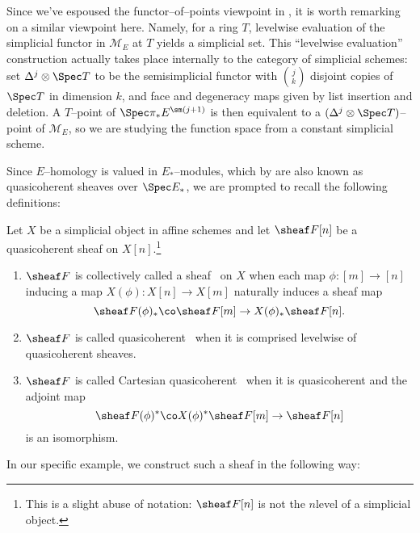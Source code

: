 \begin{remark}
Since we've espoused the functor--of--points viewpoint in , it is worth remarking on a similar viewpoint here.  Namely, for a ring $T$, levelwise evaluation of the simplicial functor in $\mathcal{M}_E$ at $T$ yields a simplicial set.  This ``levelwise evaluation'' construction actually takes place internally to the category of simplicial schemes: set $\Delta^j \otimes \Spec T$ to be the semisimplicial functor with $\binom{j}{k}$ disjoint copies of $\Spec T$ in dimension $k$, and face and degeneracy maps given by list insertion and deletion.  A $T$--point of $\Spec \pi_* E^{\sm (j+1)}$ is then equivalent to a $(\Delta^j \otimes \Spec T)$--point of $\mathcal{M}_E$, so we are studying the function space from a constant simplicial scheme.
\end{remark}

Since $E$--homology is valued in $E_*$--modules, which by  are also known as quasicoherent sheaves over $\Spec E_*$, we are prompted to recall the following definitions:
\begin{definition}
Let $X$ be a simplicial object in affine schemes and let $\sheaf F[n]$ be a quasicoherent sheaf on $X[n]$.\footnote{This is a slight abuse of notation: $\sheaf F[n]$ is not the $n$\th level of a simplicial object.}
\begin{enumerate}
\item $\sheaf F$ is collectively called a sheaf~\cite[Tag 09VK]{stacks-project} on $X$ when each map $\phi: [m] \to [n]$ inducing a map $X(\phi): X[n] \to X[m]$ naturally induces a sheaf map \[\sheaf F(\phi)_* \co \sheaf F[m] \to X(\phi)_* \sheaf F[n].\]
\item $\sheaf F$ is called quasicoherent~\cite[Tag 07TF]{stacks-project} when it is comprised levelwise of quasicoherent sheaves.
\item $\sheaf F$ is called Cartesian quasicoherent~\cite[Tag 07TF]{stacks-project} when it is quasicoherent and the adjoint map \[\sheaf F(\phi)^* \co X(\phi)^* \sheaf F[m] \to \sheaf F[n]\] is an isomorphism.
\end{enumerate}
\end{definition}

In our specific example, we construct such a sheaf in the following way:

